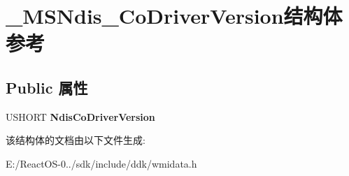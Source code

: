 \hypertarget{struct___m_s_ndis___co_driver_version}{}\section{\+\_\+\+M\+S\+Ndis\+\_\+\+Co\+Driver\+Version结构体 参考}
\label{struct___m_s_ndis___co_driver_version}
\subsection*{Public 属性}
\begin{DoxyCompactItemize}
\item 
\mbox{\label{struct___m_s_ndis___co_driver_version_a313364eb1aa7eaeb83b02a7ce94b0070}} 
U\+S\+H\+O\+RT {\bfseries Ndis\+Co\+Driver\+Version}
\end{DoxyCompactItemize}


该结构体的文档由以下文件生成\+:\begin{DoxyCompactItemize}
\item 
E\+:/\+React\+O\+S-\/0../sdk/include/ddk/wmidata.\+h\end{DoxyCompactItemize}
